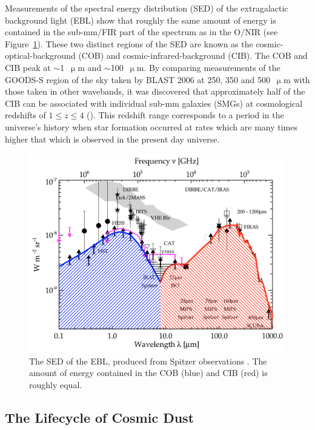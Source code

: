  Measurements of the spectral energy distribution (SED) of the extragalactic background light (EBL) show that roughly the same amount of energy is contained in the sub-mm/FIR part of the spectrum as in the O/NIR (see Figure~\ref{fig:EBL}). These two distinct regions of the SED are known as the cosmic-optical-background (COB) and cosmic-infrared-background (CIB). The COB and CIB peak at $\sim$1~$\upmu$m and $\sim$100~$\upmu$m. By comparing measurements of the GOODS-S region of the sky taken by BLAST 2006 at 250, 350 and 500~$\upmu$m with those taken in other wavebands, it was discovered that approximately half of the CIB can be associated with individual sub-mm galaxies (SMGs) at cosmological redshifts of $1 \leq z \leq 4$ (\citet{devlin2009over,marsden2009blast,pascale2009blast}). This redshift range corresponds to a period in the universe's history when star formation occurred at rates which are many times higher that which is observed in the present day universe.

\begin{figure}[!htbp]
\centering
\includegraphics[width=\textwidth]{figures/intro/cob_cib}
\caption[~The SED of extragalactic background light.]{The SED of the EBL, produced from Spitzer observations \citep{dole2006cosmic}. The amount of energy contained in the COB (blue) and CIB (red) is roughly equal.}
\label{fig:EBL}
\end{figure}

\subsection{The Lifecycle of Cosmic Dust}

